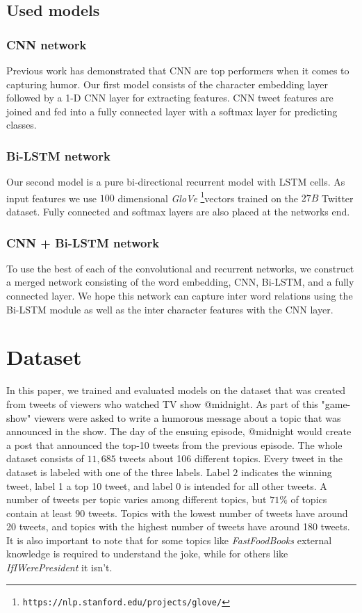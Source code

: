 \documentclass[10pt, a4paper]{article}
\begin{document}
\subsection{Used models}

\subsubsection{CNN network}
Previous work\cite{onaj_rad_s_cnn} has demonstrated that CNN are top performers
when it comes to capturing humor. Our first model consists of the character
embedding layer followed by a 1-D CNN layer for extracting features. CNN tweet
features are joined and fed into a fully connected layer with a softmax layer
for predicting classes. 

\subsubsection{Bi-LSTM network}
Our second model is a pure bi-directional recurrent model with LSTM cells. As
input features we use $100$ dimensional \emph{GloVe}
\citep{GLove}\footnote{\texttt{https://nlp.stanford.edu/projects/glove/}}vectors trained on the $27B$
Twitter dataset. Fully connected and softmax layers are also placed at the
networks end.

\subsubsection{CNN + Bi-LSTM network}
To use the best of each of the convolutional and recurrent networks, we
construct a merged network consisting of the word embedding, CNN, Bi-LSTM, and
a fully connected layer. We hope this network can capture inter word relations
using the Bi-LSTM module as well as the inter character features with the CNN
layer.

\section{Dataset}
In this paper, we trained and evaluated models on the dataset that was created
from tweets of viewers who watched TV show @midnight. As part of this "game-show"
viewers were asked to write a humorous message about a topic that was announced
in the show. The day of the ensuing episode, @midnight would create a post that
announced the top-10 tweets from the previous episode. The whole dataset consists
of $11,685$ tweets about 106 different topics. Every tweet in the dataset is
labeled with one of the three labels. Label $2$ indicates the winning tweet, label 1
a top 10 tweet, and label 0 is intended for all other
tweets. A number of tweets per topic varies among different topics, but $71\%$ of
topics contain at least $90$ tweets. Topics with the lowest number of tweets have 
around 20 tweets, and topics with the highest number of tweets have around 180 tweets.
It is also important to note that for some topics like \emph{FastFoodBooks} external
knowledge is required to understand the joke, while for others like
\emph{IfIWerePresident} it isn't.
\end{document}
